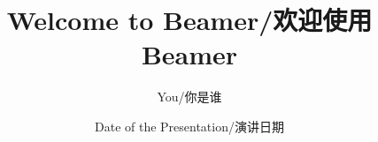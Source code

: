 \documentclass{beamer}
\title{Welcome to Beamer/欢迎使用Beamer}
\author{You/你是谁}
\institute{Where You Are From/你出自哪里}
\date{Date of the Presentation/演讲日期}
\begin{document}
\begin{CJK*}{UTF8}{gbsn}

\begin{frame}
\titlepage %
\end{frame}


\clearpage\end{CJK*}
\end{document}
